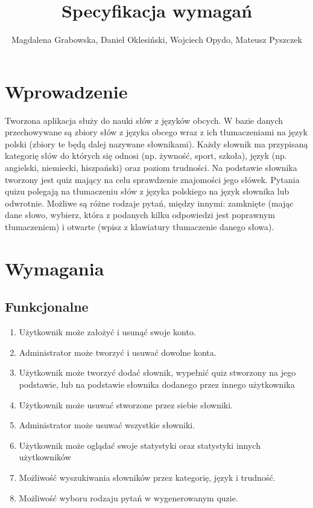 \documentclass[a4paper,10pt]{article}
\title{Specyfikacja wymagań}
\author{Magdalena Grabowska, Daniel Oklesiński, Wojciech Opydo, Mateusz Pyszczek}
\begin{document}
\maketitle
\section{Wprowadzenie}
Tworzona aplikacja służy do nauki słów z języków obcych. W bazie danych przechowywane są zbiory słów z języka obcego wraz z ich tłumaczeniami na język polski (zbiory te będą dalej nazywane słownikami). Każdy słownik ma przypisaną kategorię słów do których się odnosi (np. żywność, sport, szkoła), język (np. angielski, niemiecki, hiszpański) oraz poziom trudności. Na podstawie słownika tworzony jest quiz mający na celu sprawdzenie znajomości jego słówek. Pytania quizu polegają na tłumaczeniu słów z języka polskiego na język słownika lub odwrotnie. Możliwe są różne rodzaje pytań, między innymi: zamknięte (mając dane słowo, wybierz, która z podanych kilku odpowiedzi jest poprawnym tłumaczeniem) i otwarte (wpisz z klawiatury tłumaczenie danego słowa).
\section{Wymagania}
\subsection{Funkcjonalne}
\begin{enumerate}
\item Użytkownik może założyć i usunąć swoje konto.
\item Administrator może tworzyć i usuwać dowolne konta.
\item Użytkownik może tworzyć dodać słownik, wypełnić quiz stworzony na jego podstawie, lub na podstawie słownika dodanego przez innego użytkownika
\item Użytkownik może usuwać stworzone przez siebie słowniki.
\item Administrator może usuwać wszystkie słowniki.
\item Użytkownik może oglądać swoje statystyki oraz statystyki innych użytkowników
\item Możliwość wyszukiwania słowników przez kategorię, język i trudność. 
\item Możliwość wyboru rodzaju pytań w wygenerowanym quzie.
\end{enumerate}
\end{document}
